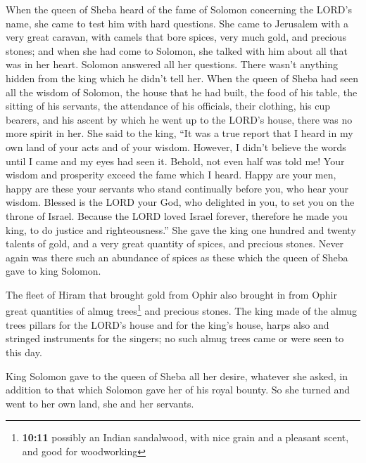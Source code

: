  When the queen of Sheba heard of the fame of Solomon
concerning the LORD's name, she came to test him with hard questions.
 She came to Jerusalem with a very great caravan, with
camels that bore spices, very much gold, and precious stones; and when
she had come to Solomon, she talked with him about all that was in her
heart.  Solomon answered all her questions. There wasn't
anything hidden from the king which he didn't tell her. 
When the queen of Sheba had seen all the wisdom of Solomon, the house
that he had built,  the food of his table, the sitting of
his servants, the attendance of his officials, their clothing, his cup
bearers, and his ascent by which he went up to the LORD's house, there
was no more spirit in her.  She said to the king, ``It was
a true report that I heard in my own land of your acts and of your
wisdom.  However, I didn't believe the words until I came
and my eyes had seen it. Behold, not even half was told me! Your wisdom
and prosperity exceed the fame which I heard.  Happy are
your men, happy are these your servants who stand continually before
you, who hear your wisdom.  Blessed is the LORD your God,
who delighted in you, to set you on the throne of Israel. Because the
LORD loved Israel forever, therefore he made you king, to do justice and
righteousness.''  She gave the king one hundred and
twenty talents of gold, and a very great quantity of spices, and
precious stones. Never again was there such an abundance of spices as
these which the queen of Sheba gave to king Solomon.

 The fleet of Hiram that brought gold from Ophir also
brought in from Ophir great quantities of almug trees\footnote{\textbf{10:11}
  possibly an Indian sandalwood, with nice grain and a pleasant scent,
  and good for woodworking} and precious stones.  The
king made of the almug trees pillars for the LORD's house and for the
king's house, harps also and stringed instruments for the singers; no
such almug trees came or were seen to this day.

 King Solomon gave to the queen of Sheba all her desire,
whatever she asked, in addition to that which Solomon gave her of his
royal bounty. So she turned and went to her own land, she and her
servants.

